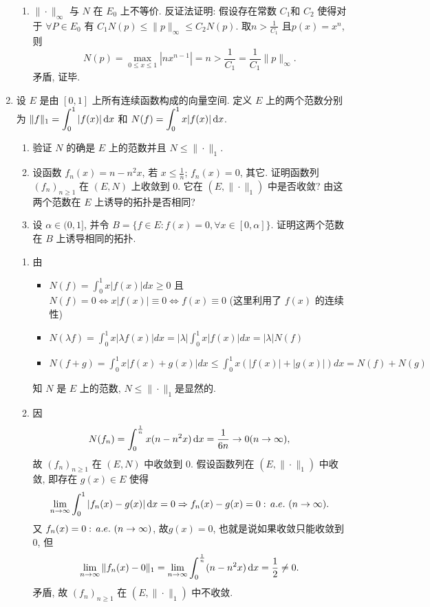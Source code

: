 \begin{enumerate}
\begin{answer}
\begin{enumerate}
        \item $\|\cdot\|_{\infty}$ 与 $N$ 在 $E_0$ 上不等价.
        反证法证明: 
        假设存在常数 $C_1 $和 $C_2$ 使得对于 $\forall P\in E_0$ 
        有 $C_1N(p)\leq\|p\|_{\infty}\leq C_2N(p)$. 取$n> \frac{1}{C_1}$ 且$p(x)=x^n$, 则
        \[N(p)=\max_{0\leq x\leq 1}|nx^{n-1}|=n> \frac{1}{C_1}= \frac{1}{C_1}\|p\|_{\infty}.\]
        矛盾, 证毕.
      \end{enumerate}
    \end{answer}
  \item 设 $E$ 是由 $[0,1]$ 上所有连续函数构成的向量空间. 
  定义 $E$ 上的两个范数分别为 $\displaystyle\|f\|_1=\int_0^1|f(x)|\mathop{}\!\mathrm{d} x$ 和 $\displaystyle N(f)=\int_0^1x|f(x)|\mathop{}\!\mathrm{d} x$.
    \begin{enumerate}
      \item 验证 $N$ 的确是 $E$ 上的范数并且 $N\leq\|\cdot\|_1$.
      \item 设函数 $f_n(x)=n-n^2x$, 若 $x\leq \frac{1}{n}$; $f_n(x)=0$, 其它. 
            证明函数列 $(f_n)_{n\geq 1}$ 在 $(E,N)$ 上收敛到 0. 它在 $(E,\|\cdot\|_1)$ 中是否收敛? 由这两个范数在 $E$ 上诱导的拓扑是否相同?
      \item 设 $\alpha\in(0,1]$, 并令 $B=\{f\in E:f(x)=0,\forall x\in[0,\alpha]\}$. 证明这两个范数在 $B$ 上诱导相同的拓扑.
    \end{enumerate}
    \begin{answer}
      \begin{enumerate}
        \item 由
        \begin{itemize}
        \item $N(f)=\int_0^1x|f(x)|dx\geq 0$ 且 $N(f)=0\Leftrightarrow x|f(x)|\equiv 0\Leftrightarrow f(x)\equiv 0$ (这里利用了 $f(x)$ 的连续性)
        \item $N(\lambda f)=\int_0^1x|\lambda f(x)|dx=|\lambda|\int_0^1x|f(x)|dx=|\lambda|N(f)$
        \item $N(f+g)=\int_0^1x|f(x)+g(x)|dx\leq \int_0^1x(|f(x)|+|g(x)|)dx=N(f)+N(g)$
        \end{itemize}
        知 $N$ 是 $E$ 上的范数, $N\leq\|\cdot\|_1$是显然的.
        
        \item 因
        \[N(f_n)=\int_0^{ \frac{1}{n}}x(n-n^2x)\mathop{}\!\mathrm{d} x= \frac{1}{6n}\rightarrow 0(n\to\infty),\]
        故 $(f_n)_{n\geq 1}$ 在 $(E,N)$ 中收敛到 $0$. 
        假设函数列在 $(E,\|\cdot\|_1)$ 中收敛, 即存在 $g(x)\in E$ 使得
        \[\lim_{n\to\infty}\int_0^1|f_n(x)-g(x)|\diff x=0\Rightarrow f_n(x)-g(x)=0\ae (n\to\infty).\]
        又 $f_n(x)=0\ae  (n\to\infty)$, 故$g(x)=0$, 也就是说如果收敛只能收敛到 0, 但
        \[\lim_{n\to\infty}\|f_n(x)-0\|_1=\lim_{n\to\infty}\int_0^{ \frac{1}{n}}(n-n^2x)\mathop{}\!\mathrm{d} x= \frac{1}{2}\neq 0.\]
        矛盾, 故 $(f_n)_{n\geq 1}$ 在 $(E,\|\cdot\|_1)$ 中不收敛.
        

\end{enumerate}
\end{answer}
\end{enumerate}
